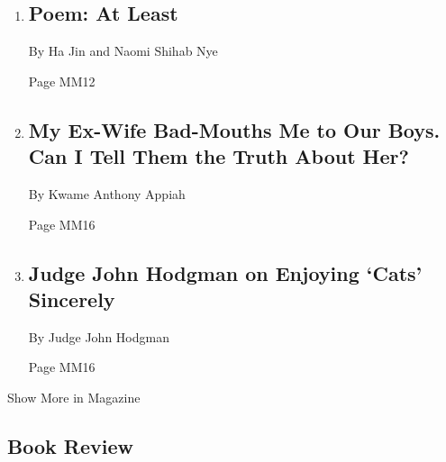 \begin{enumerate}
\def\labelenumi{\arabic{enumi}.}
\item
  \href{/2020/02/13/magazine/poem-at-least.html}{}

  \hypertarget{poem-at-least}{%
  \subsection{Poem: At Least}\label{poem-at-least}}

  By Ha Jin and Naomi Shihab Nye

  Page MM12
\item
  \href{/2020/02/11/magazine/my-ex-wife-bad-mouths-me-to-our-boys-can-i-tell-them-the-truth-about-her.html}{}

  \hypertarget{my-ex-wife-bad-mouths-me-to-our-boys-can-i-tell-them-the-truth-about-her}{%
  \subsection{My Ex-Wife Bad-Mouths Me to Our Boys. Can I Tell Them the
  Truth About
  Her?}\label{my-ex-wife-bad-mouths-me-to-our-boys-can-i-tell-them-the-truth-about-her}}

  By Kwame Anthony Appiah

  Page MM16
\item
  \href{/2020/02/13/magazine/judge-john-hodgman-on-enjoying-cats-sincerely.html}{}

  \hypertarget{judge-john-hodgman-on-enjoying-cats-sincerely}{%
  \subsection{Judge John Hodgman on Enjoying `Cats'
  Sincerely}\label{judge-john-hodgman-on-enjoying-cats-sincerely}}

  By Judge John Hodgman

  Page MM16
\end{enumerate}

Show More in Magazine

\hypertarget{book-review}{%
\subsection{Book Review}\label{book-review}}

